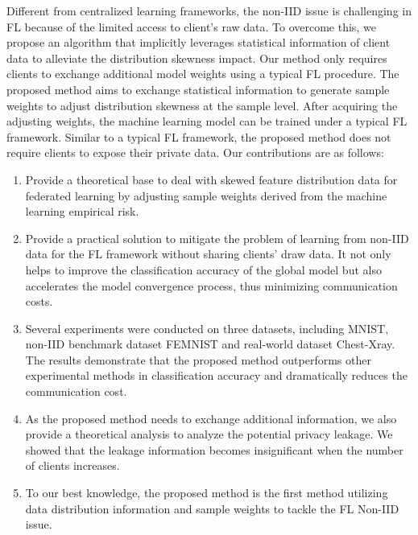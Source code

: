 \documentclass[mathfont=newtx]{uai2023} %
\begin{document}
Different from centralized learning frameworks, the non-IID issue is challenging in FL because of the limited access to client's raw data. To overcome this, we propose an algorithm that implicitly leverages statistical information of client data to alleviate the distribution skewness impact. Our method only requires clients to exchange additional model weights using a typical FL procedure. The proposed method aims to exchange statistical information to generate sample weights to adjust distribution skewness at the sample level. After acquiring the adjusting weights, the machine learning model can be trained under a typical FL framework. Similar to a typical FL framework, the proposed method does not require clients to expose their private data.
Our contributions are as follows:
\begin{enumerate}
\item Provide a theoretical base to deal with skewed feature distribution data for federated learning by adjusting sample weights derived from the machine learning empirical risk.  
\item Provide a practical solution to mitigate the problem of learning from non-IID data for the FL framework without sharing clients' draw data. It not only helps to improve the classification accuracy of the global model but also accelerates the model convergence process, thus minimizing communication costs.
\item Several experiments were conducted on three datasets, including MNIST, non-IID benchmark dataset FEMNIST and real-world dataset Chest-Xray. The results demonstrate that the proposed method outperforms other experimental methods in classification accuracy and dramatically reduces the communication cost.
\item As the proposed method needs to exchange additional information, we also provide a theoretical analysis to analyze the potential privacy leakage. We showed that the leakage information becomes insignificant when the number of clients increases. 
\item To our best knowledge, the proposed method is the first method utilizing data distribution information and sample weights to tackle the FL Non-IID issue.   
\end{enumerate}

\end{document}
